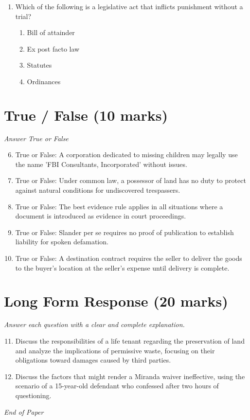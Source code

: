 \documentclass[12pt]{article}
\begin{document}
\begin{enumerate}[label=\arabic*.]
\begin{enumerate}[label=(\alph*)]
    \item interpretation of admiralty laws
    \item disputes between states and foreign citizens
    \item all of the above
\end{enumerate}
\item Which of the following is a legislative act that inflicts punishment without a trial?
\begin{enumerate}[label=(\alph*)]
    \item Bill of attainder
    \item Ex post facto law
    \item Statutes
    \item Ordinances
\end{enumerate}
\end{enumerate}

\section*{True / False (10 marks)}
\textit{Answer True or False}
\begin{enumerate}[label=\arabic*.]
\setcounter{enumi}{5}
\item True or False: A corporation dedicated to missing children may legally use the name 'FBI Consultants, Incorporated' without issues.
\item True or False: Under common law, a possessor of land has no duty to protect against natural conditions for undiscovered trespassers.
\item True or False: The best evidence rule applies in all situations where a document is introduced as evidence in court proceedings.
\item True or False: Slander per se requires no proof of publication to establish liability for spoken defamation.
\item True or False: A destination contract requires the seller to deliver the goods to the buyer's location at the seller's expense until delivery is complete.
\end{enumerate}

\section*{Long Form Response (20 marks)}
\textit{Answer each question with a clear and complete explanation.}
\begin{enumerate}[label=\arabic*.]
\setcounter{enumi}{10}
\item Discuss the responsibilities of a life tenant regarding the preservation of land and analyze the implications of permissive waste, focusing on their obligations toward damages caused by third parties.
\item Discuss the factors that might render a Miranda waiver ineffective, using the scenario of a 15-year-old defendant who confessed after two hours of questioning.
\end{enumerate}

\vfill
\noindent\textit{End of Paper}
\end{document}
